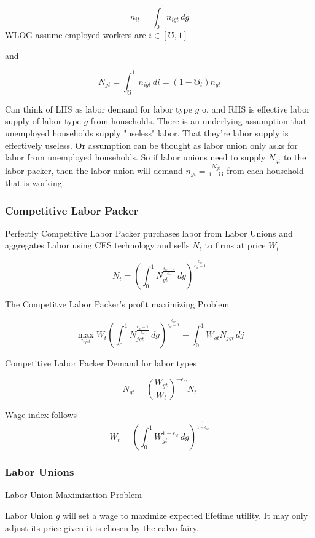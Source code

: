 \documentclass[titlepage]{\econtex}\providecommand{\texname}{BufferStockTheory}
\begin{document}
$$n_{it} = \int_{0}^{1} n_{igt}\,dg$$ WLOG assume employed workers are $i \in [\mho,1]$

and 

$$N_{gt} = \int_{\mho}^{1} n_{igt}\,di = (1-\mho_{t}) \mathit{n}_{gt}$$ 

Can think of LHS as labor demand for labor type $g$ o, and RHS is effective labor supply of labor type $g$ from households. There is an underlying assumption that unemployed households supply  "useless" labor. That they're labor supply is effectively useless. Or assumption can be thought as labor union only asks for labor from unemployed households. So if labor unions need to supply $N_{gt}$ to the labor packer, then the labor union will demand $ n_{gt} = \frac{N_{gt}}{1-\mho}$ from each household that is working.


\hypertarget{Competitive Labor Packer}{}
\subsubsection{Competitive Labor Packer}



Perfectly Competitive Labor Packer purchases labor from Labor Unions and  aggregates Labor using CES technology and sells $N_{t}$ to firms at price $W_{t}$


$$ N_{t} = \left(\int_{0}^{1} N_{gt}^{\frac{\epsilon_{w}-1}{\epsilon_{w}}}\,dg\right)^{\frac{\epsilon_{w}}{\epsilon_{w}-1}}$$

The Competitve Labor Packer's profit maximizing Problem 

$$ \max_{n_{jgt}} W_{t} \left(\int_{0}^{1} N_{jgt}^{\frac{\epsilon_{w}-1}{\epsilon_{w}}} \, dg \right)^ {\frac{\epsilon_{w}}{\epsilon_{w}-1}} - \int_{0}^{1} W_{gt}N_{jgt}\, dj $$


 Competitive Labor Packer Demand for labor types

$$ N_{gt} = \left(\frac{W_{gt}}{W_{t}}\right)^{-\epsilon_{w}} N_{t} $$

Wage index follows
$$ W_{t} = \left(\int_{0}^{1} W_{gt}^{1-\epsilon_{w}}\,dg\right)^{\frac{1}{1-\epsilon_{w}}}$$




\hypertarget{Labor Unions}{}
\subsubsection{Labor Unions}

Labor Union Maximization Problem

Labor Union $g$ will set a wage to maximize expected lifetime utility. It may only adjust its price given it is chosen by the calvo fairy. 
\end{document}
